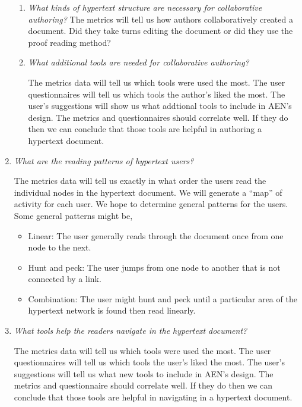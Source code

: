 \begin{enumerate}
  \begin{enumerate}
  \item{\em What kinds of hypertext structure are necessary for
    collaborative authoring?}  The metrics will tell us how authors
    collaboratively created a document.  Did they take turns editing the
    document or did they use the proof reading method?

  \item{\em What additional tools are needed for collaborative
    authoring?}

    The metrics data will tell us which tools were used the most.  The
    user questionnaires will tell us which tools the author's liked the
    most.  The user's suggestions will show us what addtional tools to
    include in AEN's design. The metrics and questionnaires should
    correlate well.  If they do then we can conclude that those tools
    are helpful in authoring a hypertext document.

  \end{enumerate} 
\item{\em What are the reading patterns of hypertext users?}

  The metrics data will tell us exactly in what order the users read the
  individual nodes in the hypertext document.  We will generate a ``map''
  of activity for each user.  We hope to determine general patterns for
  the users.  Some general patterns might be,
  
  \begin{itemize}
  \item{Linear: The user generally reads through the document once from
    one node to the next.}

  \item{Hunt and peck: The user jumps from one node to another that is
    not connected by a link.}

  \item{Combination: The user might hunt and peck until a particular area
    of the hypertext network is found then read linearly.}
  \end{itemize}

    
\item{\em What tools help the readers navigate in the hypertext document?}

  The metrics data will tell us which tools were used the most.  The user
  questionnaires will tell us which tools the user's liked the most.  The
  user's suggestions will tell us what new tools to include in AEN's
  design.  The metrics and questionnaire should correlate well.  If they
  do then we can conclude that those tools are helpful in navigating in a
  hypertext document.

\end{enumerate}


